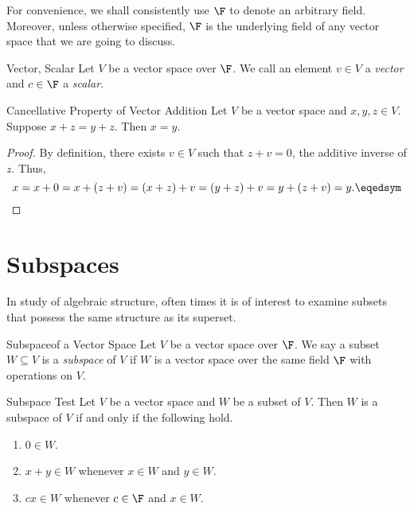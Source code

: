 \documentclass[linearalgebraI]{subfiles}
\begin{document}
    \begin{remark}
        For convenience, we shall consistently use $\F$ to denote an arbitrary field. Moreover, unless otherwise specified, $\F$ is the underlying field of any vector space that we are going to discuss.
    \end{remark}

    \begin{definition}{Vector, Scalar}{}
        Let $V$ be a vector space over $\F$. We call an element $v\in V$ a \emph{vector} and $c\in\F$ a \emph{scalar}.
    \end{definition}

    \begin{prop}{Cancellative Property of Vector Addition}
        Let $V$ be a vector space and $x, y, z\in V$. Suppose $x+z = y+z$. Then $x=y$.
    \end{prop}

    \begin{proof}
        By definition, there exists $v\in V$ such that $z+v=0$, the additive inverse of $z$. Thus,
        \begin{equation*}
            x = x+0 = x + (z+v) = (x+z) + v = (y+z) + v = y + (z+v) = y. \eqedsym
        \end{equation*}
    \end{proof}


    \section{Subspaces}

    \begin{remark}
        In study of algebraic structure, often times it is of interest to examine subsets that possess the same structure as its superset. 
    \end{remark}

    \begin{definition}{Subspace}{of a Vector Space}
        Let $V$ be a vector space over $\F$. We say a subset $W\subseteq V$ is a \emph{subspace} of $V$ if $W$ is a vector space over the same field $\F$ with operations on $V$.
    \end{definition}

    \begin{prop}{Subspace Test}
        Let $V$ be a vector space and $W$ be a subset of $V$. Then $W$ is a subspace of $V$ if and only if the following hold.
        \begin{enumerate}
            \item $0\in W$.
            \item $x+y\in W$ whenever $x\in W$ and $y\in W$.
            \item $cx\in W$ whenever $c\in \F$ and $x\in W$.
        \end{enumerate}
    \end{prop}
\end{document}
